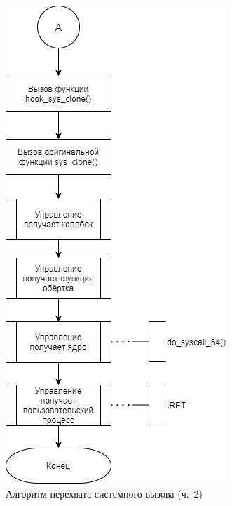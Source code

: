 \begin{figure}[h]
	\begin{center}
		\includegraphics[scale=0.6]{jpg/ftrace_algo-Page-2.jpg}
	\end{center}
	\caption{Алгоритм перехвата системного вызова (ч.~2)}
	\label{fig:ftrace_algo_p2}
\end{figure}

\newpage

